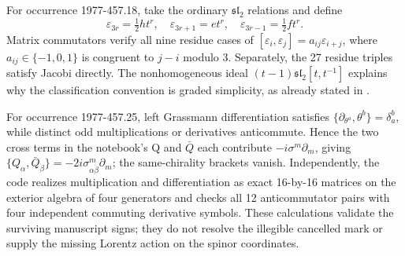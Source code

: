 \begin{remark}\oursComputed{}
For occurrence 1977-457.18, take the ordinary \(\mathfrak{sl}_2\)
relations and define
\[
 \varepsilon_{3r}=\tfrac12ht^r,\quad
 \varepsilon_{3r+1}=et^r,\quad
 \varepsilon_{3r-1}=\tfrac12ft^r.
\]
Matrix commutators verify all nine residue cases of
\([\varepsilon_i,\varepsilon_j]=a_{ij}\varepsilon_{i+j}\),
where \(a_{ij}\in\{-1,0,1\}\) is congruent to \(j-i\) modulo 3.
Separately, the 27 residue triples satisfy Jacobi directly. The
nonhomogeneous ideal \((t-1)\mathfrak{sl}_2[t,t^{-1}]\) explains why
the classification convention is graded simplicity, as already stated
in \citet[Introduction]{kac1968graded}.

For occurrence 1977-457.25, left Grassmann differentiation satisfies
\(\{\partial_{\theta^a},\theta^b\}=\delta_a^b\), while distinct
odd multiplications or derivatives anticommute. Hence the two cross
terms in the notebook's Q and \(\bar Q\) each contribute
\(-i\sigma^m\partial_m\), giving
\(\{Q_\alpha,\bar Q_{\dot\beta}\}=-2i\sigma^m_{\alpha\dot\beta}
\partial_m\); the same-chirality brackets vanish. Independently,
the code realizes multiplication and differentiation as exact 16-by-16
matrices on the exterior algebra of four generators and checks all 12
anticommutator pairs with four independent commuting derivative
symbols. These calculations validate the surviving manuscript signs;
they do not resolve the illegible cancelled mark or supply the missing
Lorentz action on the spinor coordinates.
\end{remark}
